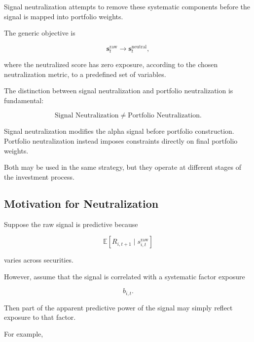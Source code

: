\documentclass[11pt,a4paper]{article}
\begin{document}
Signal neutralization attempts to remove these systematic components before the
signal is mapped into portfolio weights.

The generic objective is

\begin{equation}
\boxed{
\mathbf{s}_t^{\mathrm{raw}}
\rightarrow
\mathbf{s}_t^{\mathrm{neutral}},
}
\end{equation}

where the neutralized score has zero exposure, according to the chosen
neutralization metric, to a predefined set of variables.

The distinction between signal neutralization and portfolio neutralization is
fundamental:

\begin{equation}
\boxed{
\text{Signal Neutralization}
\neq
\text{Portfolio Neutralization}.
}
\end{equation}

Signal neutralization modifies the alpha signal before portfolio construction.
Portfolio neutralization instead imposes constraints directly on final
portfolio weights.

Both may be used in the same strategy, but they operate at different stages of
the investment process.


\subsection{Motivation for Neutralization}
\label{subsec:motivation_neutralization}

Suppose the raw signal is predictive because

\begin{equation}
\mathbb{E}
\left[
R_{i,t+1}
\mid
s_{i,t}^{\mathrm{raw}}
\right]
\end{equation}

varies across securities.

However, assume that the signal is correlated with a systematic factor
exposure

\begin{equation}
b_{i,t}.
\end{equation}

Then part of the apparent predictive power of the signal may simply reflect
exposure to that factor.

For example,
\end{document}
